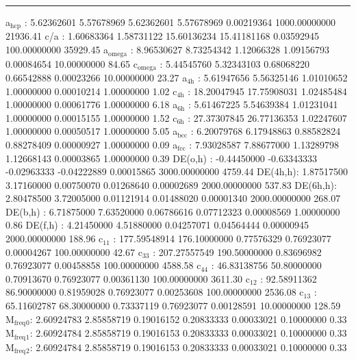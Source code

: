 \documentclass[11pt]{article}
\begin{document}
\noindent\rule{\textwidth}{0.5pt}
a\(_{\text{hcp}}\)   :   5.62362601   5.57678969   5.62362601   5.57678969   0.00219364 1000.00000000     21936.41
c/a     :   1.60683364   1.58731122  15.60136234  15.41181168   0.03592945 100.00000000     35929.45
a\(_{\text{omega}}\) :   8.96530627   8.73254342   1.12066328   1.09156793   0.00084654  10.00000000        84.65
c\(_{\text{omega}}\) :   5.44545760   5.32343103   0.68068220   0.66542888   0.00023266  10.00000000        23.27
a\(_{\text{4h}}\)    :   5.61947656   5.56325146   1.01010652   1.00000000   0.00010214   1.00000000         1.02
c\(_{\text{4h}}\)    :  18.20047945  17.75908031   1.02485484   1.00000000   0.00061776   1.00000000         6.18
a\(_{\text{6h}}\)    :   5.61467225   5.54639384   1.01231041   1.00000000   0.00015155   1.00000000         1.52
c\(_{\text{6h}}\)    :  27.37307845  26.77136353   1.02247607   1.00000000   0.00050517   1.00000000         5.05
a\(_{\text{bcc}}\)   :   6.20079768   6.17948863   0.88582824   0.88278409   0.00000927   1.00000000         0.09
a\(_{\text{fcc}}\)   :   7.93028587   7.88677000   1.13289798   1.12668143   0.00003865   1.00000000         0.39
DE(o,h) :  -0.44450000  -0.63343333  -0.02963333  -0.04222889   0.00015865 3000.00000000      4759.44
DE(4h,h):   1.87517500   3.17160000   0.00750070   0.01268640   0.00002689 2000.00000000       537.83
DE(6h,h):   2.80478500   3.72005000   0.01121914   0.01488020   0.00001340 2000.00000000       268.07
DE(b,h) :   6.71875000   7.63520000   0.06786616   0.07712323   0.00008569   1.00000000         0.86
DE(f,h) :   4.21450000   4.51880000   0.04257071   0.04564444   0.00000945 2000.00000000       188.96
c\(_{\text{11}}\)    : 177.59548914 176.10000000   0.77576329   0.76923077   0.00004267 100.00000000        42.67
c\(_{\text{33}}\)    : 207.27557549 190.50000000   0.83696982   0.76923077   0.00458858 100.00000000      4588.58
c\(_{\text{44}}\)    :  46.83138756  50.80000000   0.70913670   0.76923077   0.00361130 100.00000000      3611.30
c\(_{\text{12}}\)    :  92.58911362  86.90000000   0.81959028   0.76923077   0.00253608 100.00000000      2536.08
c\(_{\text{13}}\)    :  65.11602787  68.30000000   0.73337119   0.76923077   0.00128591  10.00000000       128.59
M\(_{\text{freq}}\)\(_{\text{0}}\):   2.60924783   2.85858719   0.19016152   0.20833333   0.00033021   0.10000000         0.33
M\(_{\text{freq}}\)\(_{\text{1}}\):   2.60924784   2.85858719   0.19016153   0.20833333   0.00033021   0.10000000         0.33
M\(_{\text{freq}}\)\(_{\text{2}}\):   2.60924784   2.85858719   0.19016153   0.20833333   0.00033021   0.10000000         0.33
\end{document}
